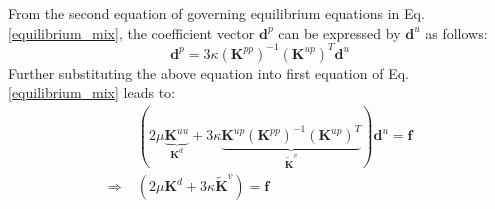 From the second equation of governing equilibrium equations in Eq. \eqref{equilibrium_mix}, the coefficient vector $\boldsymbol d^p$ can be expressed by $\boldsymbol d^u$ as follows:
\begin{equation}
    \boldsymbol d^p = 3\kappa(\boldsymbol K^{pp})^{-1} (\boldsymbol K^{up})^T \boldsymbol d^u
\end{equation}
Further substituting the above equation into first equation of Eq. \eqref{equilibrium_mix} leads to:
\begin{equation}\label{equilibrium_projection}
\begin{split}
    &(2\mu\underbrace{\boldsymbol K^{uu}}_{\boldsymbol K^d} + 3\kappa \underbrace{\boldsymbol K^{up}(\boldsymbol K^{pp})^{-1}(\boldsymbol K^{up})^{T}}_{\tilde{\boldsymbol K}^v}) \boldsymbol d^u = \boldsymbol f \\
    \Rightarrow\;& (2\mu \boldsymbol K^d + 3\kappa \tilde{\boldsymbol K}^v) = \boldsymbol f
\end{split}
\end{equation}

